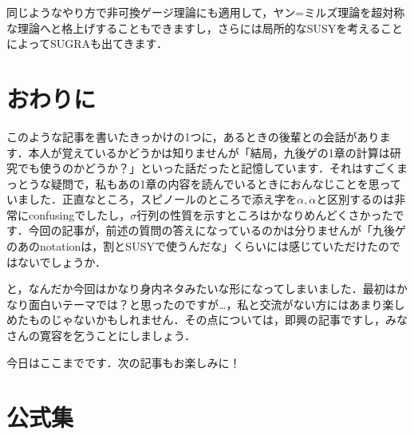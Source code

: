 \documentclass[a4paper,uplatex,dvipdfmx]{jsarticle}
\theoremstyle{definition}
\renewcommand{\theequation}{\thesection.\arabic{equation}}
\renewcommand{\thefigure}{\thesection.\arabic{figure}}
\renewcommand{\thetable}{\thesection.\arabic{table}}
\begin{document}
同じようなやり方で非可換ゲージ理論にも適用して，ヤン=ミルズ理論を超対称な理論へと格上げすることもできますし，さらには局所的なSUSYを考えることによってSUGRAも出てきます．


\section{おわりに}

このような記事を書いたきっかけの1つに，あるときの後輩との会話があります．本人が覚えているかどうかは知りませんが「結局，九後ゲ\cite{九後_ゲー_1989}の1章の計算は研究でも使うのかどうか？」といった話だったと記憶しています．それはすごくまっとうな疑問で，私もあの1章の内容を読んでいるときにおんなじことを思っていました．正直なところ，スピノールのところで添え字を$\alpha,\dot{\alpha}$と区別するのは非常にconfusingでしたし，$\sigma$行列の性質を示すところはかなりめんどくさかったです．今回の記事が，前述の質問の答えになっているのかは分りませんが「九後ゲのあのnotationは，割とSUSYで使うんだな」くらいには感じていただけたのではないでしょうか．

と，なんだか今回はかなり身内ネタみたいな形になってしまいました．最初はかなり面白いテーマでは？と思ったのですが…，私と交流がない方にはあまり楽しめたものじゃないかもしれません．その点については，即興の記事ですし，みなさんの寛容を乞うことにしましょう．

今日はここまでです．次の記事もお楽しみに！


\clearpage

\appendix
\makeatletter
\renewcommand{\appendix}{\par
  \setcounter{section}{0}%
  \setcounter{subsection}{0}%
  \gdef\presectionname{\appendixname}%
  \gdef\postsectionname{}%
  \gdef\thesection{\presectionname\@Alph\c@section\postsectionname}%
  \gdef\thesubsection{\@Alph\c@section.\@arabic\c@subsection}%
  \renewcommand{\theequation}{\@Alph\c@section.\arabic{equation}}%
  \renewcommand{\thefigure}{\@Alph\c@section.\arabic{figure}}%
  \renewcommand{\thetable}{\@Alph\c@section.\arabic{table}}%
}
\makeatother
\appendix

\section{公式集}
\label{relation}
\end{document}

